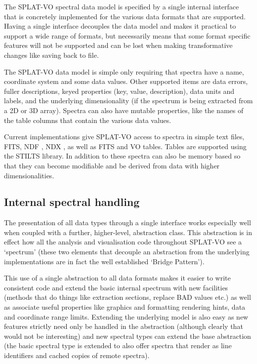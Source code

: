 \documentclass[final,authoryear,5p,times,twocolumn]{elsarticle}
\begin{document}
The SPLAT-VO spectral data model is specified by a single internal interface
that is concretely implemented for the various data formats that are
supported. Having a single interface decouples the data model and makes it
practical to support a wide range of formats, but necessarily means that some
format specific features will not be supported and can be lost when making
transformative changes like saving back to file.

The SPLAT-VO data model is simple only requiring that spectra have a name,
coordinate system and some data values. Other supported items are data errors,
fuller descriptions, keyed properties (key, value, description), data units
and labels, and the underlying dimensionality (if the spectrum is being
extracted from a 2D or 3D array). Spectra can also have mutable properties,
like the names of the table columns that contain the various data values.

Current implementations give SPLAT-VO access to spectra in simple text
files, FITS, NDF \citep{ndfjenness}, NDX \citep{2003ASPC..295..221G},
as well as FITS and VO tables. Tables are supported using the STILTS 
\citep[][]{2006ASPC..351..666T} library. In addition to these
spectra can also be memory based so that they can become modifiable and be
derived from data with higher dimensionalities.

\subsection{Internal spectral handling}

The presentation of all data types through a single interface works especially
well when coupled with a further, higher-level, abstraction class. This
abstraction is in effect how all the analysis and visualisation code
throughout SPLAT-VO see a `spectrum' (these two elements that decouple an
abstraction from the underlying implementations are in fact the well
established `Bridge Pattern').

This use of a single abstraction to all data formats makes it easier to write
consistent code and extend the basic internal spectrum with new facilities
(methods that do things like extraction sections, replace BAD values etc.) as
well as associate useful properties like graphics and formatting rendering
hints, data and coordinate range limits. Extending the underlying model is
also easy as new features strictly need only be handled in the abstraction
(although clearly that would not be interesting) and new spectral types can
extend the base abstraction (the basic spectral type is extended to also offer
spectra that render as line identifiers and cached copies of remote spectra).
\end{document}
